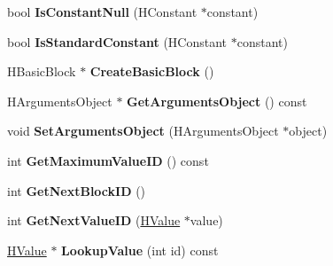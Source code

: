 \begin{DoxyCompactItemize}
\item 
\hypertarget{classv8_1_1internal_1_1_v8___f_i_n_a_l_a19c2a8e338a3f64d35e9c3af1b9c75da}{}bool {\bfseries Is\+Constant\+Null} (H\+Constant $\ast$constant)\label{classv8_1_1internal_1_1_v8___f_i_n_a_l_a19c2a8e338a3f64d35e9c3af1b9c75da}

\item 
\hypertarget{classv8_1_1internal_1_1_v8___f_i_n_a_l_adc4793037e5a8a058ebb60fd7258beb3}{}bool {\bfseries Is\+Standard\+Constant} (H\+Constant $\ast$constant)\label{classv8_1_1internal_1_1_v8___f_i_n_a_l_adc4793037e5a8a058ebb60fd7258beb3}

\item 
\hypertarget{classv8_1_1internal_1_1_v8___f_i_n_a_l_a02fca2032f23bc1744f6ad1142874c4c}{}H\+Basic\+Block $\ast$ {\bfseries Create\+Basic\+Block} ()\label{classv8_1_1internal_1_1_v8___f_i_n_a_l_a02fca2032f23bc1744f6ad1142874c4c}

\item 
\hypertarget{classv8_1_1internal_1_1_v8___f_i_n_a_l_a1968ad16af6b983e419d3264f0d4f0ee}{}H\+Arguments\+Object $\ast$ {\bfseries Get\+Arguments\+Object} () const \label{classv8_1_1internal_1_1_v8___f_i_n_a_l_a1968ad16af6b983e419d3264f0d4f0ee}

\item 
\hypertarget{classv8_1_1internal_1_1_v8___f_i_n_a_l_a478e2c2d420c8226c40467e1cf0d4052}{}void {\bfseries Set\+Arguments\+Object} (H\+Arguments\+Object $\ast$object)\label{classv8_1_1internal_1_1_v8___f_i_n_a_l_a478e2c2d420c8226c40467e1cf0d4052}

\item 
\hypertarget{classv8_1_1internal_1_1_v8___f_i_n_a_l_a7fca7d2c216291039b1ddf93dac5bbaf}{}int {\bfseries Get\+Maximum\+Value\+I\+D} () const \label{classv8_1_1internal_1_1_v8___f_i_n_a_l_a7fca7d2c216291039b1ddf93dac5bbaf}

\item 
\hypertarget{classv8_1_1internal_1_1_v8___f_i_n_a_l_add5df8f4521ba7fe6fc39c54ee371b0a}{}int {\bfseries Get\+Next\+Block\+I\+D} ()\label{classv8_1_1internal_1_1_v8___f_i_n_a_l_add5df8f4521ba7fe6fc39c54ee371b0a}

\item 
\hypertarget{classv8_1_1internal_1_1_v8___f_i_n_a_l_aa795fc2ddae31a146f573527db26d4bd}{}int {\bfseries Get\+Next\+Value\+I\+D} (\hyperlink{classv8_1_1internal_1_1_h_value}{H\+Value} $\ast$value)\label{classv8_1_1internal_1_1_v8___f_i_n_a_l_aa795fc2ddae31a146f573527db26d4bd}

\item 
\hypertarget{classv8_1_1internal_1_1_v8___f_i_n_a_l_ac836c4b7e185af74a996c414843a17f3}{}\hyperlink{classv8_1_1internal_1_1_h_value}{H\+Value} $\ast$ {\bfseries Lookup\+Value} (int id) const \label{classv8_1_1internal_1_1_v8___f_i_n_a_l_ac836c4b7e185af74a996c414843a17f3}


\end{DoxyCompactItemize}
